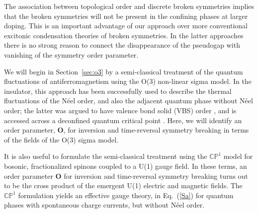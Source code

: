 \documentclass[aps,prb,preprint,onecolumn,citeautoscript,superscriptaddress,footinbib,
eqsecnum]{revtex4-1}
\begin{document}
The association between topological order and discrete broken symmetries implies that the broken symmetries will not be present in the confining phases at larger doping. This is an important advantage of our approach over more conventional excitonic condensation theories of broken symmetries. In the latter approaches there is no strong reason to connect the disappearance of the pseudogap with vanishing of the symmetry order parameter. 

We will begin in Section~\ref{sec:o3} by a semi-classical treatment of the quantum fluctuations of antiferromagnetism \cite{CHN1,CHN2,Haldane88}
using the O(3) non-linear sigma model. 
In the insulator, this approach has been successfully used to describe the thermal fluctuations of the N\'eel order, and also the adjacent
quantum phase without N\'eel order; the latter was argued to have valence bond solid (VBS) order \cite{NRSS89,NRSS90}, 
and is accessed across a deconfined
quantum critical point \cite{senthil1,senthil2}. Here, we will identify an
order parameter, ${\bm O}$, for inversion and time-reversal symmetry
breaking in terms of the fields of the O(3) sigma model.

It is also useful to formulate the semi-classical treatment using the $\mathbb{CP}^1$ model
for bosonic, fractionalized spinons coupled to a U(1) gauge field. In these terms, an order parameter ${\bm O}$ for inversion and time-reversal symmetry
breaking turns out to be the cross product of the emergent U(1) electric and magnetic fields. The $\mathbb{CP}^1$ formulation yields
an effective gauge theory, in Eq.~(\ref{Sa}) for quantum phases with spontaneous charge currents, 
but without N\'eel order.
\end{document}
